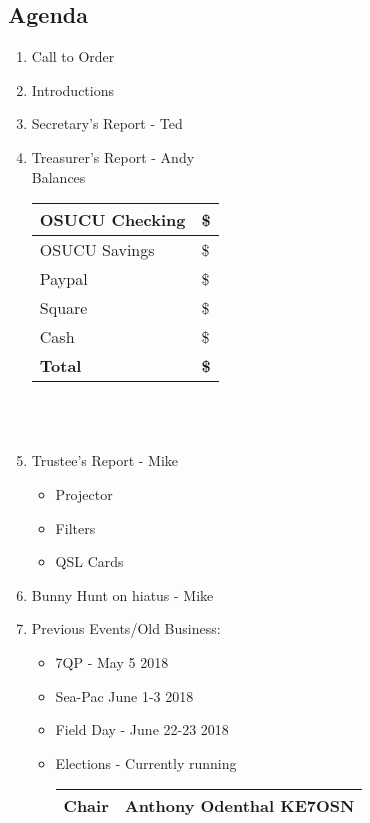 \documentclass[letter,11pt]{extarticle}
\begin{document}
	\subsection*{Agenda}
	\begin{enumerate}
		\item Call to Order
		\item Introductions
		\item Secretary's Report - Ted
		\item Treasurer's Report - Andy \\
				Balances 
			\begin{tabular}{|l|l|} \hline
				OSUCU Checking & \$ \\ \hline
				OSUCU Savings & \$ \\ \hline
				Paypal & \$ \\ \hline
				Square & \$ \\ \hline
				Cash & \$ \\ \hline
				\textbf{Total} & \textbf{\$} \\ \hline
			\end{tabular} \\ \\
		\item Trustee's Report - Mike
			\begin{itemize}
				\item Projector
				\item Filters
				\item QSL Cards
			\end{itemize}
		\item Bunny Hunt on hiatus - Mike
		\item Previous Events/Old Business:
			\begin{itemize}
				\item 7QP - May 5 2018
				\item Sea-Pac June 1-3 2018
				\item Field Day - June 22-23 2018
				\item Elections - Currently running
					\begin{tabular}{|l|l|} \hline
						Chair & Anthony Odenthal KE7OSN \\ \hline

\end{tabular}
\end{itemize}
\end{enumerate}
\end{document}
